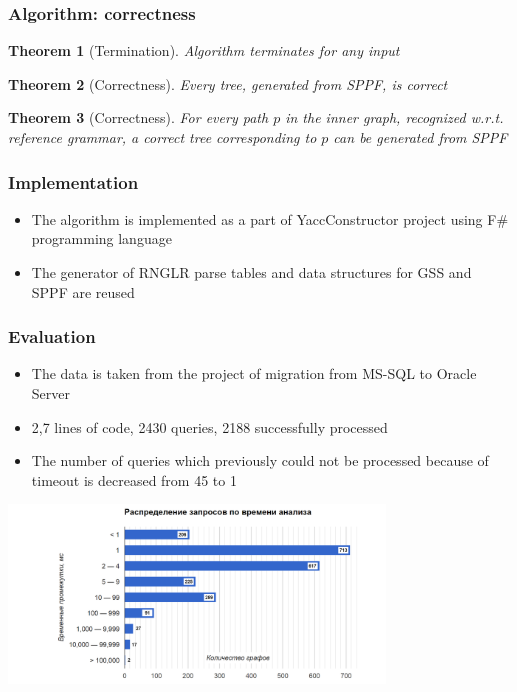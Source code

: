 \documentclass{beamer}
\newtheorem{rutheorem}{Theorem}
\begin{document}
\begin{frame}
  \transwipe[direction=90]
  \frametitle{Algorithm: correctness}
  \begin{rutheorem}[Termination]
    Algorithm terminates for any input
  \end{rutheorem}
  
  \begin{rutheorem}[Correctness]
    Every tree, generated from SPPF, is correct
  \end{rutheorem}

  \begin{rutheorem}[Correctness]
    For every path $p$ in the inner graph, recognized w.r.t. reference
grammar, a correct tree corresponding to $p$ can be generated from SPPF
  \end{rutheorem}
\end{frame}

\begin{frame}
  \transwipe[direction=90]
  \frametitle{Implementation}
  \begin{itemize}
    \item The algorithm is implemented as a part of YaccConstructor project 
using F\# programming language
    \item The generator of RNGLR parse tables and data structures for GSS and 
SPPF are reused
 \end{itemize}
\end{frame}

\begin{frame}[t]
  \transwipe[direction=90]
  \frametitle{Evaluation}
  \begin{itemize}
    \item The data is taken from the project of migration from MS-SQL to Oracle Server 
    \item 2,7 lines of code, 2430 queries, 2188 successfully processed
    \item The number of queries which previously could not be processed because 
of timeout is decreased from 45 to 1
  \end{itemize}
  \includegraphics[width=10cm]{pictures/dist.png}
\end{frame}
\end{document}
